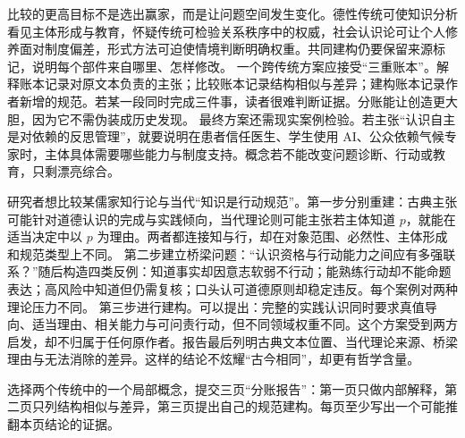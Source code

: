 比较的更高目标不是选出赢家，而是让问题空间发生变化。德性传统可使知识分析看见主体形成与教育，怀疑传统可检验关系秩序中的权威，社会认识论可让个人修养面对制度偏差，形式方法可迫使情境判断明确权重。共同建构仍要保留来源标记，说明每个部件来自哪里、怎样修改。 一个跨传统方案应接受“三重账本”。解释账本记录对原文本负责的主张；比较账本记录结构相似与差异；建构账本记录作者新增的规范。若某一段同时完成三件事，读者很难判断证据。分账能让创造更大胆，因为它不需伪装成历史发现。 最终方案还需现实案例检验。若主张“认识自主是对依赖的反思管理”，就要说明在患者信任医生、学生使用 AI、公众依赖气候专家时，主体具体需要哪些能力与制度支持。概念若不能改变问题诊断、行动或教育，只剩漂亮综合。

研究者想比较某儒家知行论与当代“知识是行动规范”。第一步分别重建：古典主张可能针对道德认识的完成与实践倾向\parencite{tiwald2014}，当代理论则可能主张若主体知道 \(p\)，就能在适当决定中以 \(p\) 为理由。两者都连接知与行，却在对象范围、必然性、主体形成和规范类型上不同。 第二步建立桥梁问题：“认识资格与行动能力之间应有多强联系？”随后构造四类反例：知道事实却因意志软弱不行动；能熟练行动却不能命题表达；高风险中知道但仍需复核；口头认可道德原则却稳定违反。每个案例对两种理论压力不同。 第三步进行建构。可以提出：完整的实践认识同时要求真值导向、适当理由、相关能力与可问责行动，但不同领域权重不同。这个方案受到两方启发，却不归属于任何原作者。报告最后列明古典文本位置、当代理论来源、桥梁理由与无法消除的差异。这样的结论不炫耀“古今相同”，却更有哲学含量。

\begin{tcolorbox}[breakable,colback=white,colframe=blue!30!black,title={专题研读任务},fonttitle=\bfseries]
选择两个传统中的一个局部概念，提交三页“分账报告”：第一页只做内部解释，第二页只列结构相似与差异，第三页提出自己的规范建构。每页至少写出一个可能推翻本页结论的证据。
\end{tcolorbox}

